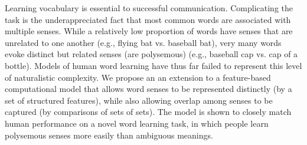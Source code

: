 Learning vocabulary is essential to successful communication. Complicating the task is the underappreciated fact that most common words are associated with multiple senses. While a relatively low proportion of words have senses that are unrelated to one another (e.g., flying bat vs. baseball bat), very many words evoke distinct but related senses (are polysemous) (e.g., baseball cap vs. cap of a bottle). Models of human word learning have thus far failed to represent this level of naturalistic complexity. We propose an an extension to a feature-based computational model that allows word senses to be represented distinctly (by a set of structured features), while also allowing overlap among senses to be captured (by comparisons of sets of sets). The model is shown to closely match human performance on a novel word learning task, in which people learn polysemous senses more easily than ambiguous meanings.
